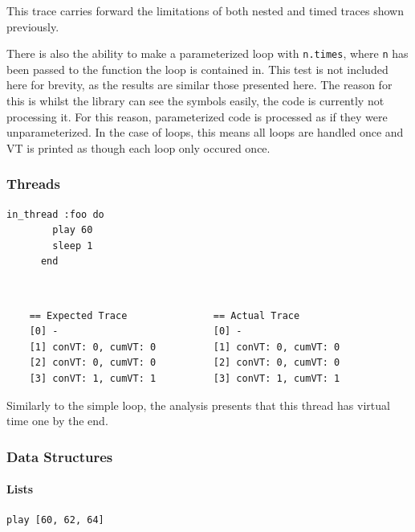 \documentclass[11pt, abstracton, twoside, titlepage=true]{scrartcl}
\begin{document}
This trace carries forward the limitations of both nested and timed traces shown 
previously.

There is also the ability to make a parameterized loop with \texttt{n.times},
where \texttt{n} has been passed to the function the loop is contained in. This
test is not included here for brevity, as the results are similar those presented
here. The reason for this is whilst the library can see the symbols easily,
the code is currently not processing it. For this reason, parameterized code
is processed as if they were unparameterized. In the case of loops, this means
all loops are handled once and VT is printed as though each loop only occured once.

\subsubsection{Threads}
\begin{minipage}{\textwidth}
	\begin{lstlisting}[style = sonicpi]
      in_thread :foo do
        play 60
        sleep 1
      end
	\end{lstlisting}
\end{minipage}
\\
\begin{lstlisting}
    == Expected Trace               == Actual Trace
    [0] -                           [0] -
    [1] conVT: 0, cumVT: 0          [1] conVT: 0, cumVT: 0
    [2] conVT: 0, cumVT: 0          [2] conVT: 0, cumVT: 0
    [3] conVT: 1, cumVT: 1          [3] conVT: 1, cumVT: 1
\end{lstlisting}

Similarly to the simple loop, the analysis presents that this thread has virtual time
one by the end. 

\subsubsection{Data Structures}
\paragraph{Lists}
\begin{minipage}{\textwidth}
	\begin{lstlisting}[style = sonicpi]
      play [60, 62, 64]
	\end{lstlisting}
\end{minipage}
\end{document}
